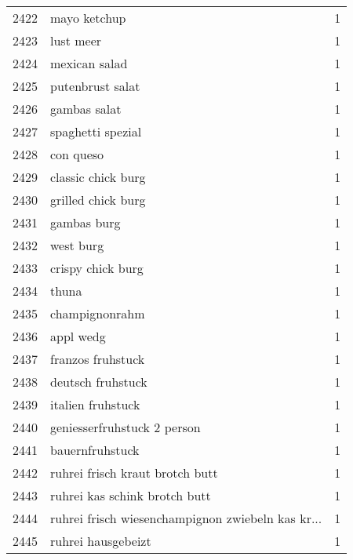 \begin{tabular}{llr}
2422 &                                       mayo ketchup &      1 \\
2423 &                                          lust meer &      1 \\
2424 &                                      mexican salad &      1 \\
2425 &                                   putenbrust salat &      1 \\
2426 &                                       gambas salat &      1 \\
2427 &                                  spaghetti spezial &      1 \\
2428 &                                          con queso &      1 \\
2429 &                                 classic chick burg &      1 \\
2430 &                                 grilled chick burg &      1 \\
2431 &                                        gambas burg &      1 \\
2432 &                                          west burg &      1 \\
2433 &                                  crispy chick burg &      1 \\
2434 &                                              thuna &      1 \\
2435 &                                     champignonrahm &      1 \\
2436 &                                          appl wedg &      1 \\
2437 &                                  franzos fruhstuck &      1 \\
2438 &                                  deutsch fruhstuck &      1 \\
2439 &                                  italien fruhstuck &      1 \\
2440 &                        geniesserfruhstuck 2 person &      1 \\
2441 &                                    bauernfruhstuck &      1 \\
2442 &                    ruhrei frisch kraut brotch butt &      1 \\
2443 &                      ruhrei kas schink brotch butt &      1 \\
2444 &  ruhrei frisch wiesenchampignon zwiebeln kas kr... &      1 \\
2445 &                                 ruhrei hausgebeizt &      1 \\

\end{tabular}
